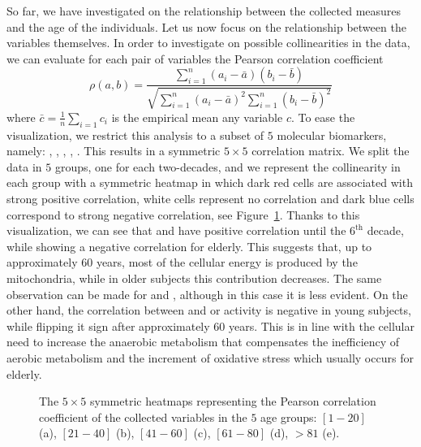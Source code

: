 So far, we have investigated on the relationship between the collected measures and the age of the individuals. Let us now focus on the relationship between the variables themselves. In order to investigate on possible collinearities in the data, we can evaluate for each pair of variables the Pearson correlation coefficient
$$
	\rho(a, b) = \frac{\sum_{i=1}^n (a_i - \bar a)(b_i - \bar b)}{\sqrt{\sum_{i=1}^n(a_i-\bar a)^2 \sum_{i=1}^n(b_i-\bar b)^2}}
$$
where $\bar c = \frac{1}{n}\sum_{i=1} c_i$ is the empirical mean any variable $c$.
To ease the visualization, we restrict this analysis to a subset of $5$ molecular biomarkers, namely: \popyrmal, \posucc, \atpamp, \ldh, \mda.
This results in a symmetric $5 \times 5$ correlation matrix.
We split the data in $5$ groups, one for each two-decades, and we represent the collinearity in each group with a symmetric heatmap in which dark red cells are associated with strong positive correlation, white cells represent no correlation and dark blue cells correspond to strong negative correlation, see Figure~\ref{fig:heatmaps}.
Thanks to this visualization, we can see that \atpamp and \popyrmal have positive correlation until the $6^{\text{th}}$ decade, while showing a negative correlation for elderly.
This suggests that, up to approximately $60$ years, most of the cellular energy is produced by the mitochondria, while in older subjects this contribution decreases. The same observation can be made for \atpamp and \posucc, although in this case it is less evident. On the other hand, the correlation between \atpamp and \mda or \ldh activity is negative in young subjects, while flipping it sign after approximately $60$ years.
This is in line with the cellular need to increase the anaerobic metabolism that compensates the inefficiency of aerobic metabolism and the increment of oxidative stress which usually occurs for elderly.

\begin{figure}[]
	\centering
		\hfill%
   \hfill
	\caption{The $5 \times 5$ symmetric heatmaps representing the Pearson correlation coefficient of the collected variables in the $5$ age groups: $[1-20]$ (a), $[21-40]$ (b), $[41-60]$ (c), $[61-80]$ (d), $>81$ (e).} \label{fig:heatmaps}
\end{figure}


